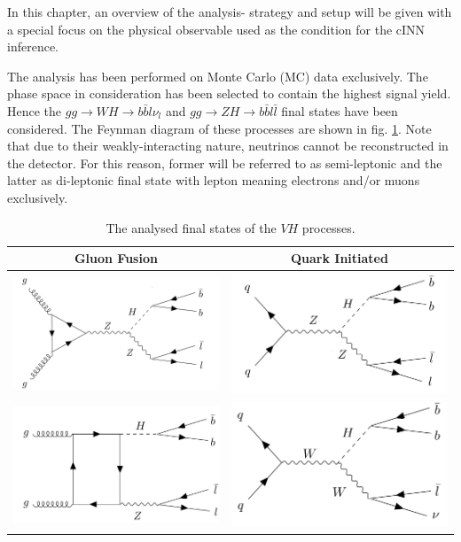 \label{ch:analysis_strategy}

In this chapter, an overview of the analysis- strategy and setup will be given with a special focus on the physical observable used as the condition for the cINN inference.


The analysis has been performed on Monte Carlo (MC) data exclusively. The phase space in consideration has been selected to contain the highest signal yield. Hence the $gg \rightarrow WH \rightarrow b\bar{b} l\nu_l$ and $gg \rightarrow ZH \rightarrow b\bar{b}l\bar{l}$ final states have been considered. The Feynman diagram of these processes are shown in fig. \ref{fig:VH_finalstates}. Note that due to their weakly-interacting nature, neutrinos cannot be reconstructed in the detector. For this reason, former will be referred to as semi-leptonic and the latter as di-leptonic final state with lepton meaning electrons and/or muons exclusively.

\begin{table}[h!]
	\centering
	\begin{tabular}{c|c}
		Gluon Fusion & Quark Initiated \\
		\hline
		\includegraphics[width=0.4\linewidth]{figures/analysis/ggZH_triangle_bbll}&\includegraphics[width=0.4\linewidth]{figures/analysis/ZH_DY_bbll}  \\
		\includegraphics[width=0.4\linewidth]{figures/analysis/ggZH_box_bbll}& \includegraphics[width=0.4\linewidth]{figures/analysis/HWbbl} \\
	\end{tabular}
	\caption{The analysed final states of the $VH$ processes.}
	\label{fig:VH_finalstates}
\end{table}

